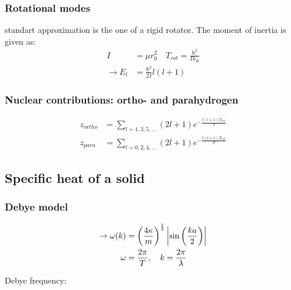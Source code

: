 \subsubsection*{Rotational modes}

standart approximation is the one of a rigid rotator. The moment of inertia is given as:
\begin{equation*}
    \begin{aligned}
        I &= \mu r_0^2 \quad T_{rot} = \frac{\hbar^2}{I k_B}\\
        \rightarrow E_l &= \frac{\hbar^2}{2I} l(l+1)
    \end{aligned}
\end{equation*}

\subsubsection*{Nuclear contributions: ortho- and parahydrogen}

\begin{equation*}
    \begin{aligned}
        z_{ortho} &= \sum_{l=1,3,5,\dots} (2l +1) e^{- \frac{l(l+1) T_{rot}}{T}} \\
        z_{para} &= \sum_{l=0,2,4,\dots} (2l +1) e^{- \frac{l(l+1) T_{rot}}{T}}
    \end{aligned}
\end{equation*}

\subsection*{Specific heat of a solid}

\subsubsection*{Debye model}

\begin{equation*}
    \begin{aligned}
        \rightarrow \omega(k) &= \left(\frac{4 \kappa}{m}\right)^{\frac{1}{2}} \left\vert\sin \left(\frac{ka}{2}\right)\right\vert \\
        \omega &= \frac{2 \pi}{T}, \quad k = \frac{2 \pi}{\lambda} \\
    \end{aligned}
\end{equation*}

Debye frequency:

